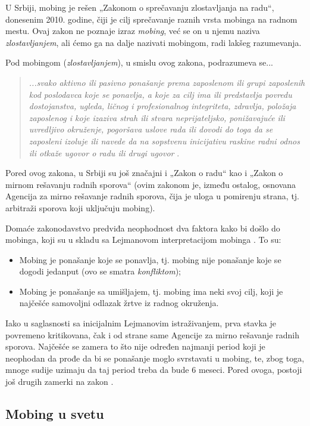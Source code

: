 \documentclass[a4paper]{article}
\newcommand{\quotes}[1]{„#1“}
\begin{document}
    U Srbiji, mobing je rešen \quotes{Zakonom o sprečavanju zlostavljanja na radu}, donesenim 2010. godine, čiji je cilj sprečavanje raznih vrsta mobinga na radnom mestu. Ovaj zakon ne poznaje izraz \textit{mobing}, već se on u njemu naziva \textit{zlostavljanjem}, ali ćemo ga na dalje nazivati mobingom, radi lakšeg razumevanja.
    
    Pod mobingom (\textit{zlostavljanjem}), u smislu ovog zakona, podrazumeva se...
    \begin{quote}
        \textit{...svako aktivno ili pasivno ponašanje prema zaposlenom ili grupi zaposlenih kod poslodavca koje se ponavlja, a koje za cilj ima ili predstavlja povredu dostojanstva, ugleda, ličnog i profesionalnog integriteta, zdravlja, položaja zaposlenog i koje izaziva strah ili stvara neprijateljsko, ponižavajuće ili uvredljivo okruženje, pogoršava uslove rada ili dovodi do toga da se zaposleni izoluje ili navede da na sopstvenu inicijativu raskine radni odnos ili otkaže ugovor o radu ili drugi ugovor} \cite{zszr}.
    \end{quote}
    Pored ovog zakona, u Srbiji su još značajni i \quotes{Zakon o radu} kao i \quotes{Zakon o mirnom rešavanju radnih sporova} (ovim zakonom je, između ostalog, osnovana Agencija za mirno rešavanje radnih sporova, čija je uloga u pomirenju strana, tj. arbitraži sporova koji uključuju mobing).
    
    Domaće zakonodavstvo predviđa neophodnost dva faktora kako bi došlo do mobinga, koji su u skladu sa Lejmanovom interpretacijom mobinga \cite{leymannmobbing}. To su:
    \begin{itemize}
        \item Mobing je ponašanje koje se ponavlja, tj. mobing nije ponašanje koje se dogodi jedanput (ovo se smatra \textit{konfliktom});
        \item Mobing je ponašanje sa umišljajem, tj. mobing ima neki svoj cilj, koji je najčešće samovoljni odlazak žrtve iz radnog okruženja.
    \end{itemize}
    Iako u saglasnosti sa inicijalnim Lejmanovim istraživanjem, prva stavka je povremeno kritikovana, čak i od strane same Agencije za mirno rešavanje radnih sporova. Najčešće se zamera to što nije određen najmanji period koji je neophodan da prođe da bi se ponašanje moglo svrstavati u mobing, te, zbog toga, mnoge sudije uzimaju da taj period treba da bude 6 meseci. Pored ovoga, postoji još drugih zamerki na zakon \cite{kritikazszr}.
    
    \subsection{Mobing u svetu}
    
\end{document}
